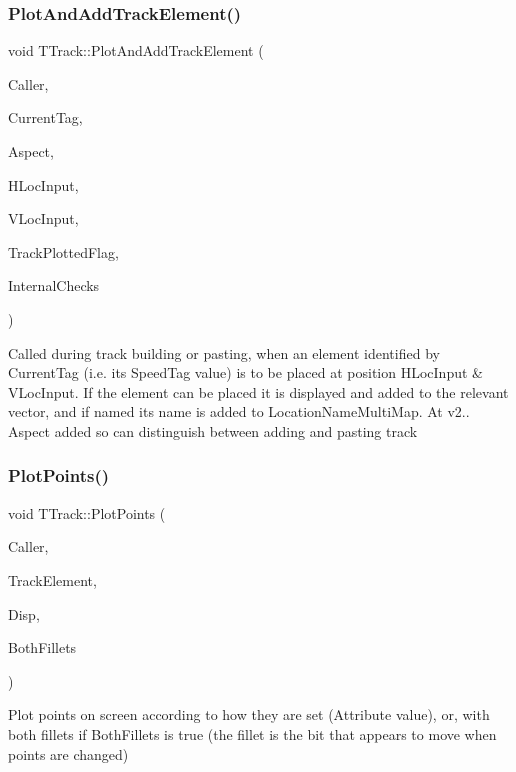 \subsubsection{\texorpdfstring{Plot\+And\+Add\+Track\+Element()}{PlotAndAddTrackElement()}}
{\footnotesize\ttfamily void T\+Track\+::\+Plot\+And\+Add\+Track\+Element (\begin{DoxyParamCaption}\item[{int}]{Caller,  }\item[{int}]{Current\+Tag,  }\item[{int}]{Aspect,  }\item[{int}]{H\+Loc\+Input,  }\item[{int}]{V\+Loc\+Input,  }\item[{bool \&}]{Track\+Plotted\+Flag,  }\item[{bool}]{Internal\+Checks }\end{DoxyParamCaption})}

Called during track building or pasting, when an element identified by Current\+Tag (i.\+e. its Speed\+Tag value) is to be placed at position H\+Loc\+Input \& V\+Loc\+Input. If the element can be placed it is displayed and added to the relevant vector, and if named its name is added to Location\+Name\+Multi\+Map. At v2.. \textquotesingle{}Aspect\textquotesingle{} added so can distinguish between adding and pasting track \mbox{\label{class_t_track_af56adb319c7003b8ddac8e55afaee3d2}} 
\subsubsection{\texorpdfstring{Plot\+Points()}{PlotPoints()}}
{\footnotesize\ttfamily void T\+Track\+::\+Plot\+Points (\begin{DoxyParamCaption}\item[{int}]{Caller,  }\item[{\mbox{\hyperlink{class_t_track_element}{T\+Track\+Element}}}]{Track\+Element,  }\item[{\mbox{\hyperlink{class_t_display}{T\+Display}} $\ast$}]{Disp,  }\item[{bool}]{Both\+Fillets }\end{DoxyParamCaption})}

Plot points on screen according to how they are set (Attribute value), or, with both fillets if Both\+Fillets is true (the fillet is the bit that appears to move when points are changed) \mbox{\label{class_t_track_ab831c2f47850f3a89678491475d52d29}} 
